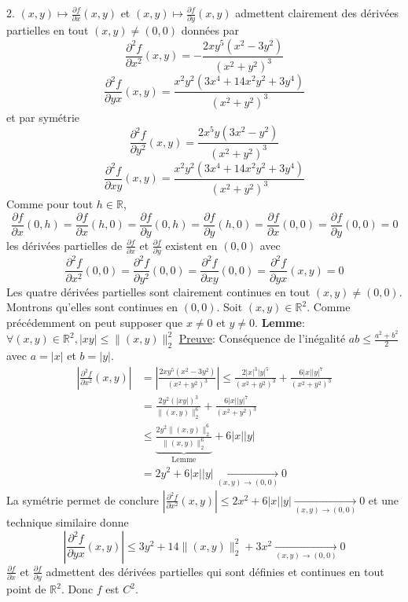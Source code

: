 \documentclass{report}
\begin{document}
2. $(x,y)\mapsto \frac{\partial f}{\partial x}(x,y)$ et $(x,y)\mapsto \frac{\partial f}{\partial y}(x,y)$ admettent clairement des dérivées partielles en tout $(x,y)\neq (0,0)$ données par $$\frac{\partial^2 f}{\partial x^2}(x,y)=-\frac{2 x y^5 \left(x^2-3 y^2\right)}{\left(x^2+y^2\right)^3}$$ $$\frac{\partial^2 f}{\partial yx}(x,y)=\frac{x^2 y^2 \left(3 x^4+14 x^2 y^2+3 y^4\right)}{\left(x^2+y^2\right)^3}$$ et par symétrie $$\frac{\partial^2 f}{\partial y^2}(x,y)=\frac{2 x^5 y \left(3 x^2-y^2\right)}{\left(x^2+y^2\right)^3}$$ $$\frac{\partial^2 f}{\partial xy}(x,y)=\frac{x^2 y^2 \left(3 x^4+14 x^2 y^2+3 y^4\right)}{\left(x^2+y^2\right)^3}$$
Comme pour tout $h\in \mathbb R$, $$\frac{\partial f}{\partial x}(0,h)=\frac{\partial f}{\partial x}(h,0)=\frac{\partial f}{\partial y}(0,h)=\frac{\partial f}{\partial y}(h,0)=\frac{\partial f}{\partial x}(0,0)=\frac{\partial f}{\partial y}(0,0)=0$$ les dérivées partielles de $\frac{\partial f}{\partial x}$ et  $\frac{\partial f}{\partial y}$ existent en $(0,0)$ avec $$\frac{\partial^2 f}{\partial x^2}(0,0)=\frac{\partial^2 f}{\partial y^2}(0,0)=\frac{\partial^2 f}{\partial xy}(0,0)=\frac{\partial^2 f}{\partial yx}(x,y)=0$$
\newline 
Les quatre dérivées partielles sont clairement continues en tout $(x,y)\neq (0,0)$. Montrons qu'elles sont continues en $(0,0)$. \newline
Soit $(x,y)\in \mathbb R^2$. Comme précédemment on peut supposer que $x\neq 0$ et $y\neq 0$.\newline
\newline
\textbf{Lemme}: $\forall (x,y)\in \mathbb R^2, |xy| \leq \|(x,y)\|_2^2$\newline
\underline{Preuve}: Conséquence de l'inégalité $ab\leq \frac{a^2+b^2}{2}$ avec $a=|x|$ et $b=|y|$.\newline
\newline
$$\begin{aligned}\left|\frac{\partial^2 f}{\partial x^2}(x,y)\right|&=\left|\frac{2 x y^5 \left(x^2-3 y^2\right)}{\left(x^2+y^2\right)^3}\right|\leq \frac{2|x|^3|y|^5}{(x^2+y^2)^3}+\frac{6|x||y|^7}{(x^2+y^2)^3}\\
&= \frac{2y^2 (|xy|)^3}{\|(x,y)\|_2^6} + \frac{6|x||y|^7}{(x^2+y^2)^3}\\
&{\leq} \underbrace{\frac{2y^2\|(x,y)\|_2^6}{\|(x,y)\|_2^6}}_{\text{Lemme}} + 6|x||y|\\
&=2y^2+ 6|x||y| \xrightarrow[(x,y)\to (0,0)]{}0
\end{aligned}$$
La symétrie permet de conclure $\left|\frac{\partial^2 f}{\partial x^2}(x,y)\right|\leq 2x^2+ 6|x||y| \xrightarrow[(x,y)\to (0,0)]{}0$ \newline et une technique similaire donne $$\left|\frac{\partial^2 f}{\partial yx}(x,y)\right|\leq 3y^2+ 14\|(x,y)\|_2^2+3x^2 \xrightarrow[(x,y)\to (0,0)]{}0$$
$\frac{\partial f}{\partial x}$ et $\frac{\partial f}{\partial y}$ admettent des dérivées partielles qui sont définies et continues en tout point de $\mathbb R^2$. Donc $f$ est $C^2$.
\end{document}

